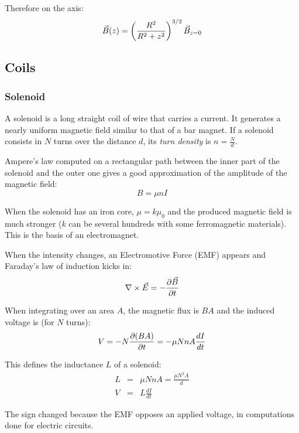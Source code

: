 \documentclass[a4paper,10pt]{article}
\newcommand{\vE}{\ensuremath\vec{E}} %
\newcommand{\vB}{\ensuremath\vec{B}} %
\newcommand{\pderiv}[2]{\ensuremath\frac{\partial #2}{\partial #1}}
\newcommand{\pdt}[1]{\ensuremath\pderiv{t}{#1}}
\begin{document}
Therefore on the axis:
\begin{equation}
  \vB(z) = \left(\frac{R^2}{R^2 + z^2}\right)^{3/2} \vB_{z=0}
\end{equation}

\subsection{Coils}

\subsubsection{Solenoid}

A solenoid is a long straight coil of wire that carries a current.
It generates a nearly uniform magnetic field similar to that of a bar magnet.
If a solenoid consists in $N$ turns over the distance $d$, its \emph{turn density} is $n = \frac{N}{d}$.

Ampere's law computed on a rectangular path between the inner part of the solenoid and the outer one gives a good approximation of the amplitude of the magnetic field:
\begin{equation}
  B = \mu n I
\end{equation}

When the solenoid has an iron core, $\mu = k \mu_0$ and the produced magnetic field is much stronger ($k$ can be several hundreds with some ferromagnetic materials).
This is the basis of an electromagnet.

When the intensity changes, an Electromotive Force (EMF) appears and Faraday's law of induction kicks in:
\begin{equation}
  \nabla \times \vE = -\pdt{\vB}
\end{equation}

When integrating over an area $A$, the magnetic flux is $BA$ and the induced voltage is (for $N$ turns):
\begin{equation}
  V = -N \pdt{(BA)} = -\mu N n A \frac{dI}{dt}
\end{equation}

This defines the inductance $L$ of a solenoid:
\begin{eqnarray}
  L &=& \mu N n A = \frac{\mu N^2 A}{d} \\
  V &=& L \frac{dI}{dt}
\end{eqnarray}

The sign changed because the EMF opposes an applied voltage, in computations done for electric circuits.
\end{document}
